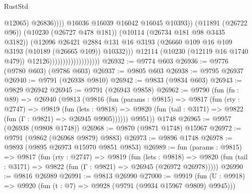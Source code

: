 \begin{lexlean}{RustStd}
\begin{coremodule}
                                                          @12065)
                                                        @26836))))
                                                @16036
                                                @16039
                                                @16042
                                                @16045
                                                @10393))
                                            (@11891 (@26722 @96))
                                            (@10230 (@26727 @478 @181))
                                            (@10114 (@26734 @181 @98 @3435 @3182))
                                            (@12096
                                              @26421
                                              @2884
                                              @131
                                              @16
                                              @3193
                                              (@26660
                                                @109
                                                @16
                                                @109
                                                @3193
                                                (@10189 (@26665 @109))
                                                @10332)))
                                          @12114
                                          (@10230 (@12119 @16 @1740 @479))
                                          @12126)))))))))))))))))))
@26932 := @9774 @603
@26936 := @9776 (@9780 @603) (@9786 @603)
@26937 := @9805 @603
@26938 := @9795 @26937
@26940 := @9791 (@26938 @9810)
@26942 := @9833 (@9834 @603)
@26943 := @9829 @26942
@26945 := @9791 (@26943 @9858)
@26962 := @9790
    (fun (fn : @89) =>
    @26940
      (@9813
        (@9816
          (fun (params : @9815) =>
          @9817
            (fun (rty : @2747) =>
            @9819
              (fun (lets : @9818) =>
              @9820 (fun (tail : @3171) => @9822 (fun (Γ : @9821) => @26945 @9905))))))
        @9951))
    @1748
@26965 := @9957 (@26938 (@9808 @1748))
@26968 := @9870 (@9871 @1748) @15967
@26972 := @9791 (@9862 (@26968 @9879) @9883)
@26973 := @9896 @1748
@26978 := @9893 (@9895 @26973 @15970 @9851 @9853)
@26989 := fun (params : @9815) =>
  @9817
    (fun (rty : @2747) =>
    @9819
      (fun (lets : @9818) =>
      @9820 (fun (tail : @3171) => @9822 (fun (Γ : @9821) => @26945 (@26972 @26978)))))
@26990 := @9816 @26989
@26991 := @9813 @26990
@27000 := @9919
    (fun (U : @9918) => @9920 (fun (t : @7) => @9928 (@9791 (@9934 @15967 @9809) @9945)))

\end{coremodule}
\end{lexlean}
